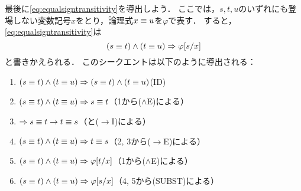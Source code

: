 最後に\cref{eq:equalsigntransitivity}を導出しよう．
ここでは，\(s, t, u\)のいずれにも登場しない変数記号\(x\)をとり，論理式\(x \equiv u\)を\(\varphi\)で表す．
すると，\cref{eq:equalsigntransitivity}は
\begin{equation*}
	\paren{s \objeq t} \land \paren{t \objeq u} \sequent \subst{\varphi}{s/x}
\end{equation*}
と書きかえられる．
このシークエントは以下のように導出される：
\begin{enumerate}
	\item \(\paren{s \objeq t} \land \paren{t \objeq u} \sequent \paren{s \objeq t} \land \paren{t \objeq u}\)\quad (ID)
	\item \(\paren{s \objeq t} \land \paren{t \objeq u} \sequent s \objeq t\)\quad （1から(\(\land\)E)による）
	\item \(\Rightarrow s \equiv t \to t \equiv s\)\quad （と(\(\to\)I)による）
	\item \(\paren{s \objeq t} \land \paren{t \objeq u} \sequent t \objeq s\)\quad （2, 3から(\(\to\)E)による）
	\item \(\paren{s \objeq t} \land \paren{t \objeq u} \sequent \subst{\varphi}{t/x}\)\quad （1から(\(\land\)E)による）
	\item \(\paren{s \objeq t} \land \paren{t \objeq u} \sequent \subst{\varphi}{s/x}\)\quad （4, 5から(SUBST)による）
\end{enumerate}